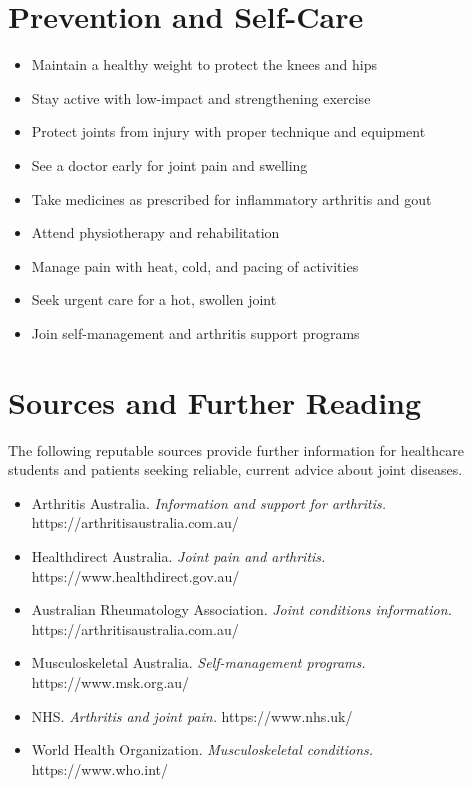 \section*{Prevention and Self-Care}
\begin{itemize}
    \item Maintain a healthy weight to protect the knees and hips
    \item Stay active with low-impact and strengthening exercise
    \item Protect joints from injury with proper technique and equipment
    \item See a doctor early for joint pain and swelling
    \item Take medicines as prescribed for inflammatory arthritis and gout
    \item Attend physiotherapy and rehabilitation
    \item Manage pain with heat, cold, and pacing of activities
    \item Seek urgent care for a hot, swollen joint
    \item Join self-management and arthritis support programs
\end{itemize}

\section*{Sources and Further Reading}
The following reputable sources provide further information for healthcare students and patients seeking reliable, current advice about joint diseases.
\begin{itemize}
    \item Arthritis Australia. \textit{Information and support for arthritis.} https://arthritisaustralia.com.au/
    \item Healthdirect Australia. \textit{Joint pain and arthritis.} https://www.healthdirect.gov.au/
    \item Australian Rheumatology Association. \textit{Joint conditions information.} https://arthritisaustralia.com.au/
    \item Musculoskeletal Australia. \textit{Self-management programs.} https://www.msk.org.au/
    \item NHS. \textit{Arthritis and joint pain.} https://www.nhs.uk/
    \item World Health Organization. \textit{Musculoskeletal conditions.} https://www.who.int/
\end{itemize}
